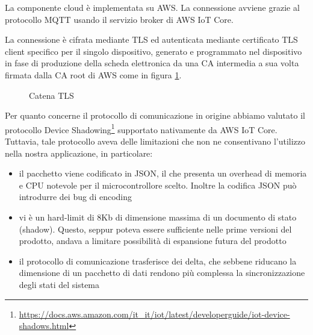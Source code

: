\documentclass[a4paper,titlepage]{article}
\begin{document}
La componente cloud è implementata su AWS. La connessione avviene grazie al protocollo
MQTT usando il servizio broker di AWS IoT Core.

La connessione è cifrata mediante TLS ed autenticata mediante certificato TLS client
specifico per il singolo dispositivo, generato e programmato nel dispositivo in fase
di produzione della scheda elettronica da una CA intermedia a sua volta firmata dalla
CA root di AWS come in figura \ref{tls-chain}.

\begin{figure}[ht]
    \centering
    \caption{Catena TLS}
    \label{tls-chain}
\end{figure}

Per quanto concerne il protocollo di comunicazione in origine abbiamo valutato il
protocollo Device Shadowing\footnote{\url{https://docs.aws.amazon.com/it\_it/iot/latest/developerguide/iot-device-shadows.html}} supportato nativamente da AWS IoT Core. Tuttavia, tale
protocollo aveva delle limitazioni che non ne consentivano l'utilizzo nella nostra
applicazione, in particolare:

\begin{itemize}
    \item il pacchetto viene codificato in JSON, il che presenta un overhead di memoria
        e CPU notevole per il microcontrollore scelto. Inoltre la codifica JSON può
        introdurre dei bug di encoding
    \item vi è un hard-limit di 8Kb di dimensione massima di un documento di stato (shadow).
        Questo, seppur poteva essere sufficiente nelle prime versioni del prodotto, andava
        a limitare possibilità di espansione futura del prodotto
    \item il protocollo di comunicazione trasferisce dei delta, che sebbene riducano la
        dimensione di un pacchetto di dati rendono più complessa la sincronizzazione degli
        stati del sistema
\end{itemize}
\end{document}
